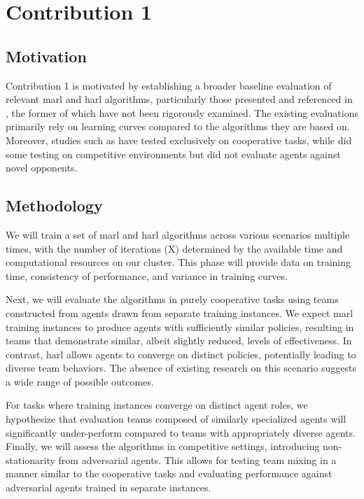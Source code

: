 

\section{Contribution 1}
\subsection{Motivation}
Contribution 1 is motivated by establishing a broader baseline evaluation of relevant 
\gls{marl} and \gls{harl} algorithms, particularly those presented and referenced in 
\cite{zhong2024}, the former of which have not been rigorously examined. 
The existing evaluations primarily rely on learning curves compared to the algorithms they are 
based on. Moreover, studies such as \cite{zhong2024,yu2022,papoudakis2021,zheng2020} have 
tested exclusively on cooperative tasks, while \cite{sun2023,lowe2020} did some testing
on competitive environments but did not evaluate agents against novel opponents.

\subsection{Methodology}
We will train a set of \gls{marl} and \gls{harl} algorithms across various scenarios multiple times, 
with the number of iterations (X) determined by the available time and computational resources on 
our cluster. This phase will provide data on training time, consistency of performance, and 
variance in training curves.

Next, we will evaluate the algorithms in purely cooperative tasks using teams constructed from 
agents drawn from separate training instances. We expect \gls{marl} training instances to produce 
agents with sufficiently similar policies, resulting in teams that demonstrate similar, 
albeit slightly reduced, levels of effectiveness. In contrast, \gls{harl} allows 
agents to converge on distinct policies, potentially leading to diverse team behaviors. 
The absence of existing research on this scenario suggests a wide range of possible outcomes.

For tasks where training instances converge on distinct agent roles, we hypothesize that evaluation
teams composed of similarly specialized agents will significantly under-perform compared to teams 
with appropriately diverse agents. Finally, we will assess the algorithms in competitive settings, 
introducing non-stationarity from adversarial agents. 
This allows for testing team mixing in a manner similar to the cooperative tasks and 
evaluating performance against adversarial agents trained in separate instances.


